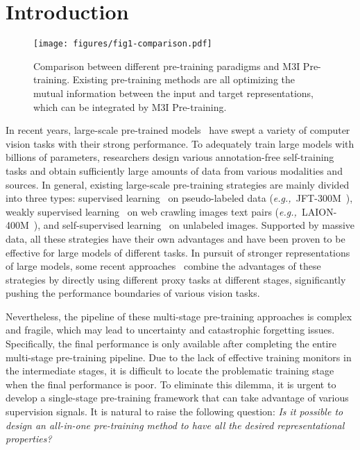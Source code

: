 \documentclass[10pt,twocolumn,letterpaper]{article}
\def\eg{\textit{e.g.,~}}
\def\name{M3I Pre-training}
\begin{document}
\section{Introduction}
\label{sec:intro}
\vspace{-0.5em}

\begin{figure}
    \centering
    \texttt{[image: figures/fig1-comparison.pdf]}
    \vspace{-2.0em}
    \caption{Comparison between different pre-training paradigms and \name{}. Existing pre-training methods are all optimizing the mutual information between the input and target representations, which can be integrated by \name{}.}
    \label{fig:comparison}
    \vspace{-1.5em}
\end{figure}


In recent years, large-scale pre-trained models~\cite{tan2019efficientnet,radford2021learning,jia2021scaling,bao2021beit,he2022masked,chen2020simple,grill2020bootstrap,zbontar2021barlow} have swept a variety of computer vision tasks with their strong performance.
To adequately train large models with billions of parameters, researchers design various annotation-free self-training tasks and obtain sufficiently large amounts of data from various modalities and sources.
In general, existing large-scale pre-training strategies are mainly divided into three types: supervised learning~\cite{tan2019efficientnet,dai2021coatnet} on pseudo-labeled data (\eg JFT-300M~\cite{xie2020self}), weakly supervised learning~\cite{radford2021learning,jia2021scaling} on web crawling images text pairs (\eg LAION-400M~\cite{schuhmann2021laion}), and self-supervised learning~\cite{chen2020simple,grill2020bootstrap,zbontar2021barlow,bao2021beit,he2022masked} on  unlabeled images. Supported by massive data, all these strategies have their own advantages and have been proven to be effective for large models of different tasks.
In pursuit of stronger representations of large models, some recent approaches~\cite{wang2022image,liu2022swin,wei2022contrastive} combine the advantages of these strategies by directly using different proxy tasks at different stages, significantly pushing the performance boundaries of various vision tasks.

Nevertheless,
the pipeline of these multi-stage pre-training approaches is complex and fragile, which may lead to uncertainty and catastrophic forgetting issues.
Specifically, the final performance is only available after completing the entire multi-stage pre-training pipeline. Due to the lack of effective training monitors in the intermediate stages, it is difficult to locate the problematic training stage when the final performance is poor.
To eliminate this dilemma, it is urgent to develop a single-stage pre-training framework that can take advantage of various supervision signals.
It is natural to raise the following question: \textit{Is it possible to design an all-in-one pre-training method to have all the desired representational properties? }
\end{document}

